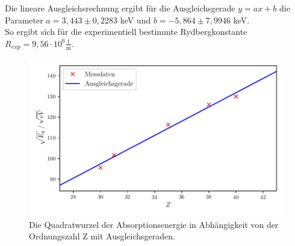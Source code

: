 Die lineare Ausgleichsrechnung ergibt für die Ausgleichsgerade $y = ax + b$ die Parameter $a = 3,443 \pm 0,2283$ keV und $b = -5,864 \pm 7,9946$ keV.\\
So ergibt sich für die experimentiell bestimmte Rydbergkonstante $R_{exp} = 9,56 \cdot 10^6 \mathrm{\frac{1}{m}}$. 

\begin{figure}
  \centering
  \includegraphics{plot_moseley.pdf}
  \caption{Die Quadratwurzel der Absorptionsenergie in Abhängigkeit von der Ordnungszahl Z mit Ausgleichsgeraden.}
  \label{fig:moseley}
\end{figure}










%

